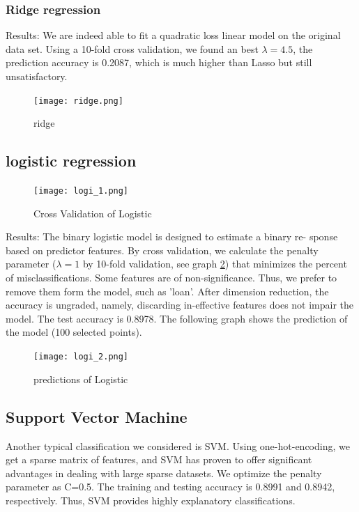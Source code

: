 \documentclass{mytemplate}%
\begin{document}
\begin{multicols}{2}
\subsubsection{Ridge regression}
Results: We are indeed able to fit a quadratic loss
linear model on the original data set. Using a 10-fold cross validation,
we found an best $\lambda = 4.5$, the prediction accuracy is 0.2087, which is much higher than Lasso but still unsatisfactory. 

\begin{figure}[H]
  \centering
  \texttt{[image: ridge.png]}\\
  \caption{ridge}\label{g06}
\end{figure}

\subsection{logistic regression}
\begin{figure}[H]
  \centering
  \texttt{[image: logi\_1.png]}\\
  \caption{Cross Validation of Logistic}\label{g07}
\end{figure}

Results: The binary logistic model is designed to estimate a binary re-
sponse based on predictor features. By cross validation, we
calculate the penalty parameter ($\lambda=1$ by 10-fold validation, see graph \ref{g07}) that minimizes the percent of misclassifications. Some features are of non-significance. Thus, we prefer to remove them form the model, such as ’loan’. After dimension reduction, the accuracy is ungraded, namely, discarding in-effective features does not impair the model. The test accuracy is 0.8978. The following graph shows the prediction of the model (100 selected points).

\begin{figure}[H]
  \centering
  \texttt{[image: logi\_2.png]}\\
  \caption{predictions of Logistic}\label{g08}
\end{figure}
\subsection{Support Vector Machine}
Another typical classification we considered is SVM. Using one-hot-encoding, we get a sparse matrix of features, and SVM  has proven to offer significant advantages in dealing with large sparse datasets. We optimize the penalty parameter as C=0.5. The training and testing accuracy is 0.8991 and 0.8942, respectively. Thus, SVM provides highly explanatory classifications.



\end{multicols}
\end{document}

